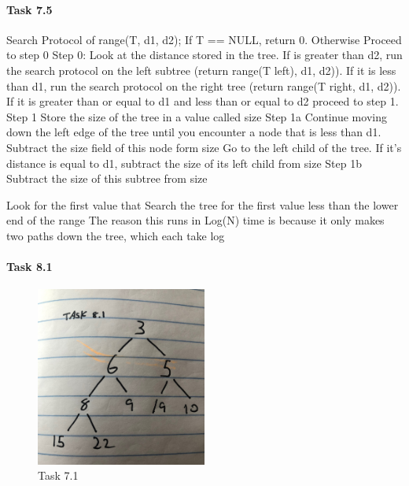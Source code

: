 \documentclass[11pt]{article}
\begin{document}
\paragraph{Task 7.5}
Search Protocol of range(T, d1, d2);
\newline If T == NULL, return 0. Otherwise Proceed to step 0
\newline Step 0:
\newline Look at the distance stored in the tree. If is greater than d2, run the search protocol on the left subtree (return range(T \rightarrow left), d1, d2)). If it is less than d1, run the search protocol on the right tree (return range(T \rightarrow right, d1, d2)). If it is greater than or equal to d1 and less than or equal to d2 proceed to step 1.
\newline Step 1
\newline Store the size of the tree in a value called size%
\newline Step 1a
\newline Continue moving down the left edge of the tree until you encounter a node that is less than d1. Subtract the size field of this node form size%
Go to the left child of the tree. If it's distance is equal to d1, subtract the size of its left child from size%
\newline Step 1b
\newline Subtract the size of this subtree from size%

\newline Look for the first value that 
\newline Search the tree for the first value less than the lower end of the range
\newline The reason this runs in Log(N) time is because it only makes two paths down the tree, which each take log


\paragraph{Task 8.1}
\begin{figure}[htbp]
 \begin{center}
  \includegraphics[width=0.5\textwidth]{8_1.JPG}
  \caption{Task 7.1}
 \end{center}
\end{figure}
\end{document}
